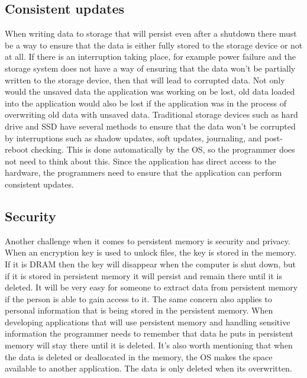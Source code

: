 \documentclass[12pt,a4paper,UKenglish]{article}
\begin{document}
\subsection{Consistent updates}
When writing data to storage that will persist even after a shutdown there must be a way to ensure that the data is either fully stored to the storage device or not at all. If there is an interruption taking place, for example power failure and the storage system does not have a way of ensuring that the data won’t be partially written to the storage device, then that will lead to corrupted data. Not only would the unsaved data the application was working on be lost, old data loaded into the application would also be lost if the application was in the process of overwriting old data with unsaved data\cite{Volos}. 
Traditional storage devices such as hard drive and SSD have several methods to ensure that the data won’t be corrupted by interruptions such as shadow updates, soft updates, journaling, and post-reboot checking. This is done automatically by the OS, so the programmer does not need to think about this. Since the application has direct access to the hardware, the programmers need to ensure that the application can perform consistent updates. 

\subsection{Security}
Another challenge when it comes to persistent memory is security and privacy\cite{Badam}. When an encryption key is used to unlock files, the key is stored in the memory. If it is DRAM then the key will disappear when the computer is shut down, but if it is stored in persistent memory it will persist and remain there until it is deleted. It will be very easy for someone to extract data from persistent memory if the person is able to gain access to it. The same concern also applies to personal information that is being stored in the persistent memory. When developing applications that will use persistent memory and handling sensitive information the programmer needs to remember that data he puts in persistent memory will stay there until it is deleted. It’s also worth mentioning that when the data is deleted or deallocated in the memory, the OS makes the space available to another application. The data is only deleted when its overwritten.
\end{document}
